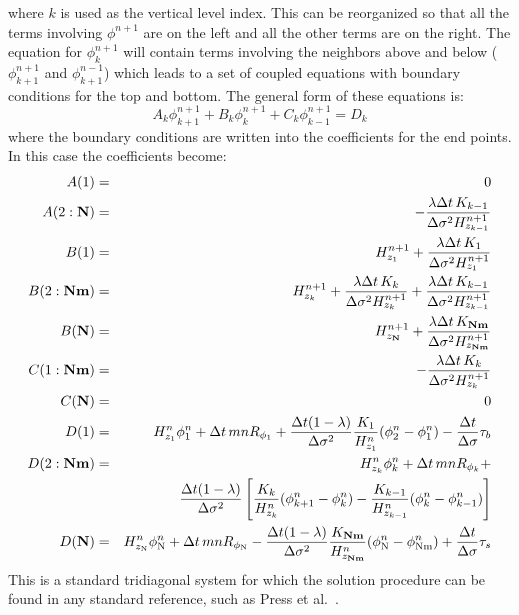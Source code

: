 where $k$ is used as the vertical level index.
This can be reorganized so that all the terms involving $\phi^{n+1}$
are on the left and all the other terms are on the right.  The
equation for $\phi_k^{n+1}$ will contain terms involving the
neighbors above and below ($\phi_{k+1}^{n+1}$ and $\phi_{k+1}^{n-1}$)
which leads to a set of coupled equations with boundary conditions
for the top and bottom.  The general form of these equations is:
\begin{equation}
   A_k \phi_{k+1}^{n+1} + B_k \phi_k^{n+1} + C_k \phi_{k-1}^{n+1} = D_k
\end{equation}
where the boundary conditions are written into the coefficients
for the end points.  In this case the coefficients become:
\begin{eqnarray}
   A(1) & = & 0 \\
   A(2:{\bf N}) & = & - {\lambda \Delta t \, K_{k-1}
   \over \Delta \sigma^2 H^{n+1}_{z_{k-1}} } \\
   B(1) & = & H^{n+1}_{z_1} + {\lambda \Delta t \, K_1 \over
   \Delta \sigma^2 H^{n+1}_{z_1} } \\
   B(2:{\bf Nm}) & = & H_{z_k}^{n+1}
   + {\lambda \Delta t \, K_k \over \Delta \sigma^2 H_{z_k}^{n+1} }
   + {\lambda \Delta t \, K_{k-1} \over
   \Delta \sigma^2 H^{n+1}_{z_{k-1}}}\\
   B({\bf N}) & = & H^{n+1}_{z_{\bf N}}
   + {\lambda \Delta t \, K_{\bf Nm} \over
       \Delta \sigma^2 H^{n+1}_{z_{\bf Nm}} } \\
   C(1:{\bf Nm}) & = & - {\lambda \Delta t \, K_k
   \over \Delta \sigma^2 H_{z_k}^{n+1} } \\
   C({\bf N}) & = & 0 \\
   D(1) & = & H^n_{z_1} \phi_1^n + \Delta t \, mn R_{{\phi}_1}
   + {\Delta t (1-\lambda) \over \Delta \sigma^2 }{ K_1 \over H^n_{z_1}}
   (\phi_2^n - \phi_1^n) - {\Delta t \over \Delta \sigma} \tau_b \\
   D(2:{\bf Nm}) & = & H^n_{z_k} \phi_k^n + \Delta t \, mn R_{{\phi}_k}
   + \\
   && {\Delta t (1-\lambda) \over \Delta \sigma^2 } \left[
   { K_k \over H^n_{z_k}} (\phi_{k+1}^n - \phi_k^n) -
   { K_{k-1} \over H^n_{z_{k-1}}} (\phi_k^n - \phi_{k-1}^n)
   \right] \\
   D({\bf N}) & = & H^n_{z_{\rm N}} \phi_{\rm N}^n +
   \Delta t \, mn R_{{\phi}_{\rm N}}
   - {\Delta t (1-\lambda) \over \Delta \sigma^2 }
   { K_{\bf Nm} \over H^n_{z_{\bf Nm}}}
   (\phi_{\rm N}^n - \phi_{\rm Nm}^n) + {\Delta t \over \Delta
   \sigma} \tau_s
\end{eqnarray}
This is a standard tridiagonal system for which the solution
procedure can be found in any standard reference, such as Press et
al.\ \cite{PFTV}.

